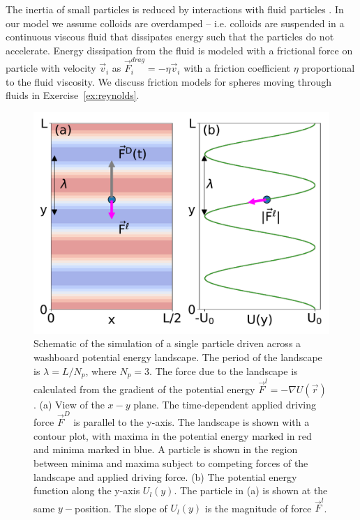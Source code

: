 \documentclass[twocolumn,preprintnumbers,amsmath,amssymb,aps,prx]{revtex4}
\begin{document}
The inertia of 
small particles is reduced by interactions
with fluid particles \cite{Purcell1977}.
In our model
we assume 
colloids are overdamped
-- i.e. colloids are suspended in a continuous viscous fluid
that dissipates energy %
such 
that the particles do not accelerate.
Energy dissipation from the fluid is modeled
with a frictional force on particle with velocity $\vec{v}_i$ as
$\vec{F}^{drag}_i = -\eta \vec{v}_i$
with a friction coefficient $\eta$
proportional to the fluid viscosity.
We discuss friction models for
spheres moving through fluids in 
Exercise~\ref{ex:reynolds}. %
\begin{center}
\begin{figure}[h!]
\centering
\includegraphics[width=\columnwidth]{landscape.pdf}
\caption{
  Schematic of the simulation
  of a single particle
  driven across a washboard potential
  energy landscape.
  The period of the landscape is $\lambda = L/N_p$,  
  where $N_p = 3$.  
  The force due to the landscape %
  is calculated from the gradient of the potential
  energy 
  $\vec{F}^l = -\nabla U(\vec{r})$.
  (a) View of the $x-y$ plane. %
  The time-dependent applied driving force $\vec{F}^D$
  is parallel to the y-axis.
  The landscape is shown with a contour plot,
  with maxima in the potential energy marked in red
  and minima marked in blue.
  A particle is shown in the region between minima and maxima
  subject to competing forces of the landscape and applied driving force.
  (b) The potential energy function
  along the y-axis $U_l(y)$.  
  The particle in (a) is shown at the same $y-$position.
  The slope of $U_l(y)$ is the 
  magnitude of force $\vec{F}^l$. %
  }
\label{fig:landscape0}
\end{figure}
\end{center}
\end{document}
